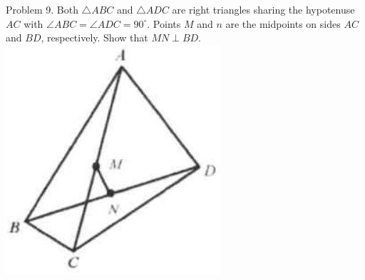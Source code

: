 \documentclass[10pt]{article}
\begin{document}
Problem 9. Both \(\triangle A B C\) and \(\triangle A D C\) are right triangles sharing the hypotenuse \(A C\) with \(\angle A B C=\angle A D C=90^{\circ}\). Points \(M\) and \(n\) are the midpoints on sides \(A C\) and \(B D\), respectively. Show that \(M N \perp B D\).\\
\includegraphics[max width=\textwidth, center]{2025_04_17_97bc1f7e44d93c271a88g-016(3)}
\end{document}
